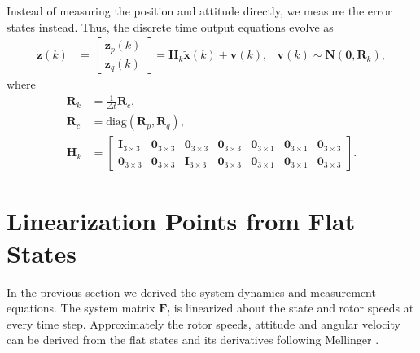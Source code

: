 \documentclass[10pt,a4paper]{article}
\newcommand{\zthree}{\mathbf{0}_{3\times3}}
\newcommand{\zthreeone}{\mathbf{0}_{3\times1}}
\newcommand{\identity}{\mathbf{I}_{3\times3}}
\begin{document}
Instead of measuring the position and attitude directly, we measure the error states instead.  Thus, the discrete time output equations evolve as
\begin{align}
\mathbf{z}(k) &= \begin{bmatrix}
\mathbf{z}_p(k) \\ \mathbf{z}_q(k)
\end{bmatrix} = \mathbf{H}_k \tilde{\mathbf{x}}(k) + \mathbf{v}(k) , &\mathbf{v}(k) \sim \mathcal{\mathbf{N}} \left( \mathbf{0}, \mathbf{R}_k \right), 
\end{align}
where
\begin{align}
\mathbf{R}_k &= \frac{1}{\Delta t} \mathbf{R}_c, \\
\mathbf{R}_c &= \mathrm{diag} \left( \mathbf{R}_p, \mathbf{R}_q \right), \\
\mathbf{H}_k &= \begin{bmatrix}
\identity & \zthree & \zthree & \zthree & \zthreeone & \zthreeone & \zthree \\
\zthree & \zthree & \identity & \zthree & \zthreeone & \zthreeone & \zthree
\end{bmatrix}.
\end{align}

\section{Linearization Points from Flat States}
In the previous section we derived the system dynamics and measurement equations. The system matrix $\mathbf{F}_l$ is linearized about the state and rotor speeds at every time step. Approximately the rotor speeds, attitude and angular velocity can be derived from the flat states and its derivatives following Mellinger \cite{mellinger2011minimum}.
\end{document}
